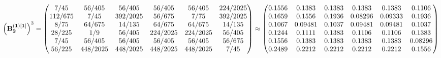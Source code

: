 \documentclass[10pt,a4paper]{article}
\begin{document}
	\[
		\left(\bold{B_2^{(1)[1]}}\right)^{3} = 
		\begin{pmatrix}
			{{7}} / {{45}} & {{56}} / {{405}} & {{56}} / {{405}} & {{56}} / {{405}} & {{56}} / {{405}} & {{224}} / {{2025}} \\
			{{112}} / {{675}} & {{7}} / {{45}} & {{392}} / {{2025}} & {{56}} / {{675}} & {{7}} / {{75}} & {{392}} / {{2025}} \\
			{{8}} / {{75}} & {{64}} / {{675}} & {{14}} / {{135}} & {{64}} / {{675}} & {{64}} / {{675}} & {{14}} / {{135}} \\
			{{28}} / {{225}} & {1} / {{9}} & {{56}} / {{405}} & {{224}} / {{2025}} & {{224}} / {{2025}} & {{56}} / {{405}} \\
			{{7}} / {{45}} & {{56}} / {{405}} & {{56}} / {{405}} & {{56}} / {{405}} & {{56}} / {{405}} & {{56}} / {{675}} \\
			{{56}} / {{225}} & {{448}} / {{2025}} & {{448}} / {{2025}} & {{448}} / {{2025}} & {{448}} / {{2025}} & {{7}} / {{45}} \\
		\end{pmatrix}
		\approx
		\begin{pmatrix}
			0.1556   & 0.1383   & 0.1383   & 0.1383   & 0.1383   & 0.1106   \\
			0.1659   & 0.1556   & 0.1936   & 0.08296  & 0.09333  & 0.1936   \\
			0.1067   & 0.09481  & 0.1037   & 0.09481  & 0.09481  & 0.1037   \\
			0.1244   & 0.1111   & 0.1383   & 0.1106   & 0.1106   & 0.1383   \\
			0.1556   & 0.1383   & 0.1383   & 0.1383   & 0.1383   & 0.08296  \\
			0.2489   & 0.2212   & 0.2212   & 0.2212   & 0.2212   & 0.1556   \\
		\end{pmatrix}
	\]
\end{document}
